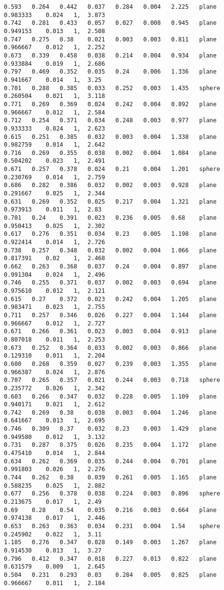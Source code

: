 {\begin{lstlisting}[caption={Datos obtenidos para la prueba del plano usando AGC.}]
0.593	0.264	0.442	0.037	0.284	0.004	2.225	plane	0.983333	0.024	1, 	3.873
0.742	0.281	0.433	0.057	0.027	0.008	0.945	plane	0.949153	0.013	1, 	2.508
0.747	0.275	0.38	0.021	0.003	0.003	0.811	plane	0.966667	0.012	1, 	2.252
0.673	0.339	0.458	0.038	0.214	0.004	0.934	plane	0.933884	0.019	1, 	2.686
0.797	0.469	0.352	0.035	0.24	0.006	1.336	plane	0.941667	0.014	1, 	3.25
0.701	0.288	0.385	0.033	0.252	0.003	1.435	sphere	0.260504	0.021	1, 	3.118
0.771	0.269	0.369	0.024	0.242	0.004	0.892	plane	0.966667	0.012	1, 	2.584
0.712	0.254	0.371	0.034	0.248	0.003	0.977	plane	0.933333	0.024	1, 	2.623
0.615	0.251	0.385	0.032	0.003	0.004	1.338	plane	0.982759	0.014	1, 	2.642
0.716	0.269	0.355	0.038	0.002	0.004	1.084	plane	0.504202	0.023	1, 	2.491
0.671	0.257	0.378	0.024	0.21	0.004	1.201	sphere	0.230769	0.014	1, 	2.759
0.686	0.282	0.386	0.032	0.002	0.003	0.928	plane	0.291667	0.025	1, 	2.344
0.631	0.269	0.352	0.025	0.217	0.004	1.321	plane	0.973913	0.011	1, 	2.83
0.701	0.24	0.391	0.023	0.236	0.005	0.68	plane	0.950413	0.025	1, 	2.302
0.617	0.276	0.351	0.034	0.23	0.005	1.198	plane	0.922414	0.014	1, 	2.726
0.738	0.257	0.348	0.032	0.002	0.004	1.066	plane	0.817391	0.02	1, 	2.468
0.662	0.263	0.368	0.037	0.24	0.004	0.897	plane	0.991304	0.024	1, 	2.496
0.746	0.255	0.371	0.037	0.002	0.003	0.694	plane	0.975610	0.012	1, 	2.121
0.615	0.27	0.372	0.023	0.242	0.004	1.205	plane	0.983471	0.023	1, 	2.755
0.711	0.257	0.346	0.026	0.227	0.004	1.144	plane	0.966667	0.012	1, 	2.727
0.671	0.266	0.361	0.023	0.003	0.004	0.913	plane	0.807018	0.011	1, 	2.253
0.673	0.252	0.364	0.033	0.002	0.003	0.866	plane	0.129310	0.011	1, 	2.204
0.600	0.268	0.359	0.027	0.239	0.003	1.355	plane	0.966387	0.024	1, 	2.876
0.707	0.265	0.357	0.021	0.244	0.003	0.718	sphere	0.235772	0.026	1, 	2.342
0.603	0.266	0.347	0.032	0.228	0.005	1.109	plane	0.940171	0.021	1, 	2.612
0.742	0.269	0.38	0.038	0.003	0.004	1.246	plane	0.641667	0.013	1, 	2.695
0.746	0.309	0.37	0.032	0.23	0.003	1.429	plane	0.949580	0.012	1, 	3.132
0.731	0.287	0.375	0.026	0.235	0.004	1.172	plane	0.475410	0.014	1, 	2.844
0.634	0.262	0.369	0.035	0.244	0.004	0.701	plane	0.991803	0.026	1, 	2.276
0.744	0.262	0.38	0.039	0.261	0.005	1.165	plane	0.588235	0.025	1, 	2.882
0.677	0.256	0.378	0.038	0.224	0.003	0.896	sphere	0.213675	0.017	1, 	2.49
0.69	0.28	0.54	0.035	0.216	0.003	0.664	plane	0.974138	0.017	1, 	2.446
0.653	0.263	0.363	0.034	0.231	0.004	1.54	sphere	0.245902	0.022	1, 	3.11
1.185	0.276	0.347	0.028	0.149	0.003	1.267	plane	0.914530	0.013	1, 	3.27
0.796	0.412	0.347	0.018	0.227	0.013	0.822	plane	0.631579	0.009	1, 	2.645
0.504	0.231	0.293	0.03	0.284	0.005	0.825	plane	0.966667	0.011	1, 	2.184

\end{lstlisting}}
